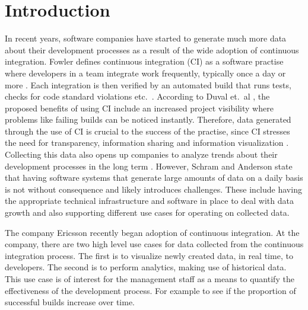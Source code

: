 \chapter{Introduction}
\label{chap:Introduction}

In recent years, software companies have started to generate much more data about their development processes as a result of the wide adoption of continuous integration. Fowler \cite{FowlerCI} defines continuous integration (CI) as a software practise where developers in a team integrate work frequently, typically once a day or more \cite{FowlerCI}. Each integration is then verified by an automated build that runs tests, checks for code standard violations etc.\ \cite{FowlerCI}. According to Duval et.\ al \cite{CIbook}, the proposed benefits of using CI include an increased project visibility where problems like failing builds can be noticed instantly. Therefore, data generated through the use of CI is crucial to the success of the practise, since CI stresses the need for transparency, information sharing and information visualization \cite{FowlerCI, CIbook}. Collecting this data also opens up companies to analyze trends about their development processes in the long term \cite{bigDataMane, CIbook}. However, Schram and Anderson \cite{MySQLToNoSQL} state that having software systems that generate large amounts of data on a daily basis is not without consequence and likely introduces challenges. These include having the appropriate technical infrastructure and software in place to deal with data growth and also supporting different use cases for operating on collected data.  

The company Ericsson recently began adoption of continuous integration. At the company, there are two high level use cases for data collected from the continuous integration process. The first is to visualize newly created data, in real time, to developers. The second is to perform analytics, making use of historical data. This use case is of interest for the management staff as a means to quantify the effectiveness of the development process. For example to see if the proportion of successful builds increase over time.



